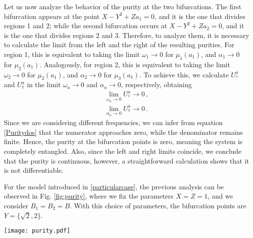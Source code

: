 \documentclass[12pt]{iopart}
\begin{document}
Let us now analyze the behavior of the purity at the two bifurcations. The first bifurcation appears at the point $X - Y^2 + Z a_1 = 0$, and it is the one that divides regions 1 and 2; while the second bifurcation occurs at $X - Y^2 + Z a_2 = 0$, and it is the one that divides regions 2 and 3. Therefore, to analyze them, it is necessary to calculate the limit from the left and the right of the resulting purities. For region 1, this is equivalent to taking the limit $\omega_1 \to 0$ for $\mu_1(a_1)$, and $\alpha_1 \to 0$ for $\mu_2(a_1)$. Analogously, for region 2, this is equivalent to taking the limit $\omega_2 \to 0$ for $\mu_2(a_1)$, and $\alpha_2 \to 0$ for $\mu_3(a_1)$. To achieve this, we calculate $U_{{}^\psi}^a$ and $U_{{}^\chi}^a$ in the limit $\omega_a\to 0$ and $\alpha_a\to 0$, respectively, obtaining
\begin{subequations}
\begin{align}
    \lim_{\omega_a\to 0}U_{{}^\psi}^a\to 0 \,,\\
    \lim_{\alpha_a\to 0} U_{{}^\chi}^a\to 0\,.
\end{align}
\end{subequations}
Since we are considering different frequencies, we can infer from equation \eqref{Puritydos} that the numerator approaches zero, while the denominator remains finite. Hence, the purity at the bifurcation points is zero, meaning the system is completely entangled. Also, since the left and right limits coincide, we conclude that the purity is continuous, however, a straightforward calculation shows that it is not differentiable. 

For the model introduced in \eqref{particularcase}, the previous analysis can be observed in Fig. \ref{fig:purity}, where we fix the parameters $X=Z=1$, and we consider $B_1=B_2=B$.  With this choice of parameters, the bifurcation points are $Y=\{\sqrt{2},2\}$.
\begin{figure*}
\centering
\texttt{[image: purity.pdf]}
  \caption{\justifying Purity as a function of the parameter $Y$. The parameters are fixed at $X=Z=1$, with this choice of parameters, the bifurcation points are $Y=\sqrt{2}$ and $Y=2$.}
    \label{fig:purity}
\end{figure*}
\end{document}
